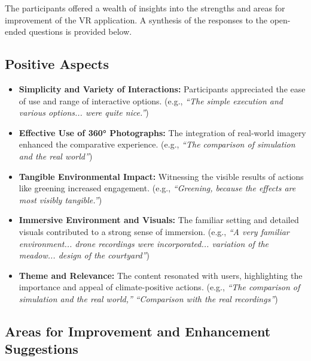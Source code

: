 \documentclass[draft, final]{vutinfth} %
\begin{document}
The participants offered a wealth of insights into the strengths and areas for improvement of the VR application. A synthesis of the responses to the open-ended questions is provided below. 

\subsection{Positive Aspects}

\begin{itemize}
    \item \textbf{Simplicity and Variety of Interactions:} Participants appreciated the ease of use and range of interactive options. (e.g., \textit{``The simple execution and various options... were quite nice.''})
    \item \textbf{Effective Use of 360° Photographs:} The integration of real-world imagery enhanced the comparative experience. (e.g., \textit{``The comparison of simulation and the real world''})
    \item \textbf{Tangible Environmental Impact:} Witnessing the visible results of actions like greening increased engagement. (e.g., \textit{``Greening, because the effects are most visibly tangible.''})
    \item \textbf{Immersive Environment and Visuals:} The familiar setting and detailed visuals contributed to a strong sense of immersion. (e.g., \textit{``A very familiar environment... drone recordings were incorporated... variation of the meadow... design of the courtyard''}) 
    \item \textbf{Theme and Relevance:} The content resonated with users, highlighting the importance and appeal of climate-positive actions. (e.g., \textit{``The comparison of simulation and the real world,''} \textit{``Comparison with the real recordings''}) 
\end{itemize}

\subsection{Areas for Improvement and Enhancement Suggestions}
\end{document}
